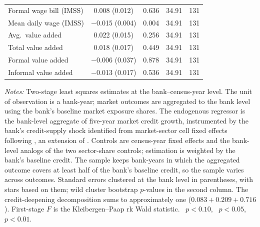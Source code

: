 \begin{threeparttable}
\begin{tabular}{lcccr}
        Formal wage bill (IMSS)         & \phantom{$-$}0.008          (0.012) & 0.636 & 34.91 & 131 \\
        Mean daily wage (IMSS)          & $-$0.015\sym{***} (0.004) & 0.004 & 34.91 & 131 \\
        Avg.\ value added               & \phantom{$-$}0.022          (0.015) & 0.256 & 34.91 & 131 \\
        Total value added               & \phantom{$-$}0.018          (0.017) & 0.449 & 34.91 & 131 \\
        Formal value added              & $-$0.006          (0.037) & 0.878 & 34.91 & 131 \\
        Informal value added            & $-$0.013          (0.017) & 0.536 & 34.91 & 131 \\
        \bottomrule
    \end{tabular}
    \begin{tablenotes}[flushleft]
        \footnotesize
        \item \textit{Notes:} Two-stage least squares estimates at the bank--census-year level. The unit of observation is a bank-year; market outcomes are aggregated to the bank level using the bank's baseline market exposure shares. The endogenous regressor is the bank-level aggregate of five-year market credit growth, instrumented by the bank's credit-supply shock identified from market-sector cell fixed effects following \citet{degryse2019identifying}, an extension of \citet{khwaja2008tracing}. Controls are census-year fixed effects and the bank-level analogs of the two sector-share controls; estimation is weighted by the bank's baseline credit. The sample keeps bank-years in which the aggregated outcome covers at least half of the bank's baseline credit, so the sample varies across outcomes. Standard errors clustered at the bank level in parentheses, with stars based on them; wild cluster bootstrap $p$-values in the second column. The credit-deepening decomposition sums to approximately one ($0.083+0.209+0.716$). First-stage $F$ is the Kleibergen--Paap rk Wald statistic. \sym{*}~$p<0.10$, \sym{**}~$p<0.05$, \sym{***}~$p<0.01$.
    \end{tablenotes}
\end{threeparttable}